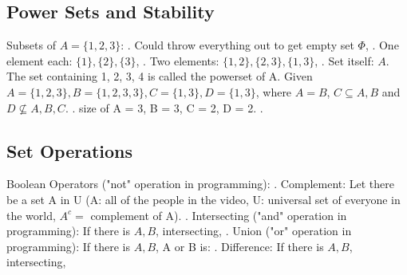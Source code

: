 \documentclass{article}
\begin{document}
\subsection{Power Sets and Stability}
Subsets of $A = \{1, 2, 3\} $:
. Could throw everything out to get empty set $\Phi$,
. One element each: $\{ 1 \}, \{ 2 \}, \{ 3 \}$,
. Two elements: $\{ 1, 2 \}, \{ 2, 3 \}, \{ 1, 3 \}$,
. Set itself: $A$.
\newline
The set containing 1, 2, 3, 4 is called the powerset of A.
\newline
\newline
Given $
A = \{1, 2, 3\}, B = \{1, 2, 3, 3\}, C = \{1, 3\}, D = \{1, 3\}$, where \newline
$A = B$, $C \subseteq A, B$ and $D \not \subseteq A, B, C$.
. size of A = 3, B = 3, C = 2, D = 2.
\newline
[Exercise with A  = {0, 1, {0, 1}}, B done in word].
\newpage
\subsection{Set Operations}
Boolean Operators ("not" operation in programming): 
. Complement:
\newline
Let there be a set A in U (A: all of the people in the video, U: universal set of everyone in the world, $A^c =$ complement of A).
\newline
\newline
{}
\newline
{}. Intersecting ("and" operation in programming):
\newline
If there is $A, B$, intersecting, 
\newline
\newline
{}
\newline
{}. Union ("or" operation in programming):
If there is $A, B$, A or B is:
\newline
\newline
{}
\newline
{}. Difference:
If there is $A, B$, intersecting, 
\newline
\newline
{}
\newline
{}
\newpage
\end{document}
